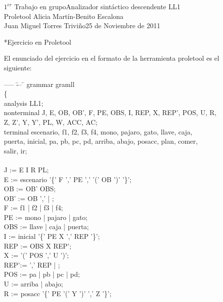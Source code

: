 \documentclass[11pt,a4paper,spanish,twoside]{book}
\makeatletter
\renewcommand{\section}{
  \@startsection{section}{1}{0mm}{\baselineskip}
  {2.5mm}{\Large\bf}
}
\theoremstyle{plain} \newtheorem{nota}{Nota}
\makeatother
\begin{document}
{$1^{er}$ Trabajo en grupo}{Analizador sintáctico descendente LL1\\Proletool}
{Alicia Martín-Benito Escalona\\Juan Miguel Torres Triviño}{25 de Noviembre de 
2011}  


\section*{Ejercicio en Proletool}
 
El enunciado del ejercicio en el formato de la herramienta proletool es el 
siguiente:\\

\begin{tabbing}
----- \= --- \= \kill
grammar gramll\\
\{\\
\> analysis LL1;\\
\> nonterminal J, E, OB, OB', F, PE, OBS, I, REP, X, REP', POS, U, R,\\
\> \> Z, Z', Y, Y', PL, W, ACC, AC;\\
\> terminal escenario, f1, f2, f3, f4, mono, pajaro, gato, llave, caja, \\
\> \> puerta, inicial, pa, pb, pc, pd, arriba, abajo, posacc, plan, comer,\\
\> \> salir, ir;\\
\\
\> J := E I R PL;\\
\> E := escenario '\{' F ',' PE ',' '(' OB ')' '\}';\\
\> OB  := OB' OBS;\\
\> OB' := OB ',' | ;\\
\> F   := f1 | f2 | f3 | f4;\\
\> PE  := mono | pajaro | gato;\\
\> OBS := llave | caja | puerta;\\
\> I   := inicial '\{' PE X ',' REP '\}';\\
\> REP := OBS X REP';\\
\> X   := '(' POS ',' U ')';\\
\> REP':= ',' REP | ;\\
\> POS := pa | pb | pc | pd;\\
\> U   := arriba | abajo;\\
\> R   := posacc '\{' PE '(' Y ')' ',' Z '\}';\\

\end{tabbing}
\end{document}
